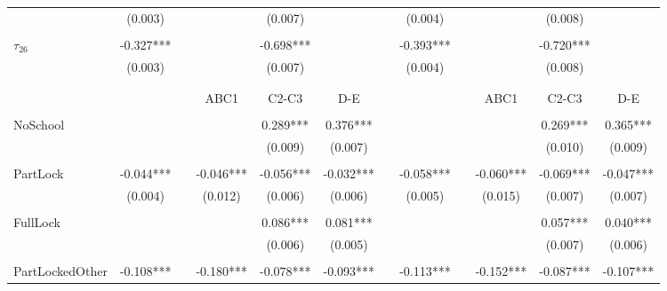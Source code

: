 \begin{tabular}{@{\extracolsep{-2pt}}lccccccccccc}
            &  (0.003)  &&      &  (0.007)  &          &&  (0.004)  &&      &  (0.008)  &            \\
            &           &&      &           &          &&           &&      &           &            \\[-2.1ex]
$\tau_{26}$ & -0.327*** &&      & -0.698*** &          && -0.393*** &&      & -0.720*** &            \\
            &  (0.003)  &&      &  (0.007)  &          &&  (0.004)  &&      &  (0.008)  &            \\
            &           &&      &          &          &&           &&      &           &            \\[-2.1ex]
\cline{4-6} \cline{10-12} \\ [-1.5ex]      
                    &           &&    ABC1   &   C2-C3   &    D-E    &&           &&    ABC1   &   C2-C3   &    D-E    \\\\[-.7ex]  
NoSchool            &           &&           &  0.289*** &  0.376*** &&           &&           &  0.269*** &  0.365*** \\
                    &           &&           &   (0.009) &   (0.007) &&           &&           &   (0.010) &   (0.009) \\
                    &           &&           &           &           &&           &&           &           &           \\[-2.1ex]
PartLock    & -0.044*** && -0.046*** & -0.056*** & -0.032*** && -0.058*** && -0.060*** & -0.069*** & -0.047*** \\
                    &  (0.004)  &&  (0.012)  &  (0.006)  &  (0.006)  &&  (0.005)  &&  (0.015)  &  (0.007)  &  (0.007)  \\
                    &           &&           &           &           &&           &&           &           &           \\[-2.1ex]
FullLock      &           &&           &  0.086*** &  0.081*** &&           &&           &  0.057*** &  0.040*** \\
                    &           &&           &   (0.006) &   (0.005) &&           &&           &   (0.007) &   (0.006) \\
                    &           &&           &           &           &&           &&           &           &           \\[-2.1ex]
PartLockedOther & -0.108*** && -0.180*** & -0.078*** & -0.093*** && -0.113*** && -0.152*** & -0.087*** & -0.107*** \\

\end{tabular}
